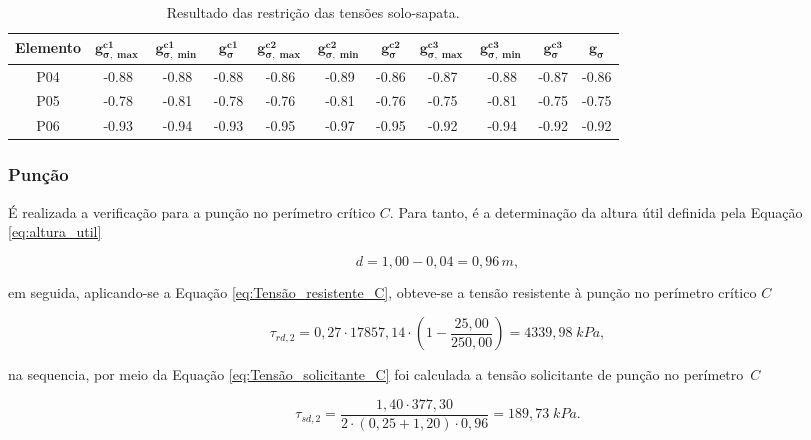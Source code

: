 \begin{table}[htpb!]
\caption{Resultado das restrição das tensões solo-sapata.}
\label{tab:restricoes_tensoes_s16}
\centering
\begin{tabular}{ccccccccccc}
\toprule
\textbf{Elemento} & $\mathbf{g_{\sigma,\max}^{c1}}$ & $\mathbf{g_{\sigma,\min}^{c1}}$ & $\mathbf{g_{\sigma}^{c1}}$ &
$\mathbf{g_{\sigma,\max}^{c2}}$ & $\mathbf{g_{\sigma,\min}^{c2}}$ & $\mathbf{g_{\sigma}^{c2}}$ &
$\mathbf{g_{\sigma,\max}^{c3}}$ & $\mathbf{g_{\sigma,\min}^{c3}}$ & $\mathbf{g_{\sigma}^{c3}}$ &
$\mathbf{g_{\sigma}}$ \\
\midrule
P04 & -0.88 & -0.88 & -0.88 & -0.86 & -0.89 & -0.86 & -0.87 & -0.88 & -0.87 & -0.86 \\
P05 & -0.78 & -0.81 & -0.78 & -0.76 & -0.81 & -0.76 & -0.75 & -0.81 & -0.75 & -0.75 \\
P06 & -0.93 & -0.94 & -0.93 & -0.95 & -0.97 & -0.95 & -0.92 & -0.94 & -0.92 & -0.92 \\
\bottomrule
\end{tabular}
\end{table}

\subsubsection{Punção}

É realizada a verificação para a punção no perímetro crítico $C$. Para tanto, é a determinação da altura útil definida pela Equação \eqref{eq:altura_util}

\begin{equation}
    d = 1,00 - 0,04 = 0,96 \, m,
    \label{eq:altura_util_el16}
\end{equation}

em seguida, aplicando-se a Equação \eqref{eq:Tensão_resistente_C}, obteve-se a tensão resistente à punção no perímetro crítico $C$

\begin{equation}
 \tau_{rd,2} = 0,27 \cdot 17857,14\cdot \left( 1 - \frac{25,00}{250,00} \right) = 4339,98\;kPa,
     \label{eq:EL16_Tensão_resistente_C}
\end{equation}
 
na sequencia, por meio da Equação \eqref{eq:Tensão_solicitante_C} foi calculada a tensão solicitante de punção no perímetro~$C$

\begin{equation}
 \tau_{sd,2} = \frac{1,40 \cdot 377,30}{2 \cdot (0,25 + 1,20) \cdot 0,96} = 189,73 \; kPa.
     \label{eq:EL16_Tensão_solicitante_C}
\end{equation}

